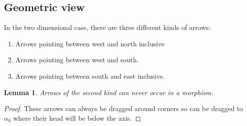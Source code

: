 \documentclass[a4page]{article}
\newtheorem{lemma}{Lemma}[section]
\theoremstyle{definition}
\begin{document}
\subsection{Geometric view}
In the two dimensional case, there are three different kinds of arrows:
\begin{enumerate}
	\item Arrows pointing between west and north inclusive
	\item Arrows pointing between west and south.
	\item Arrows pointing between south and east inclusive.
\end{enumerate}
\begin{lemma}
	Arrows of the second kind can never occur in a morphism.
\end{lemma}
\begin{proof}
These arrows can always be dragged around corners so can be dragged to $\alpha_0$ where their head will be below the axis.
\end{proof}
\end{document}
